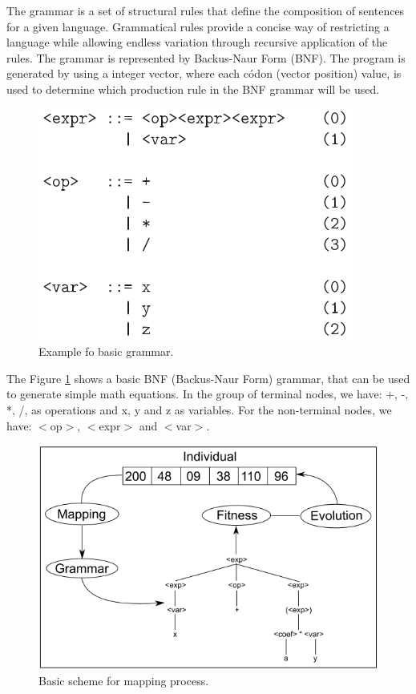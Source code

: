\documentclass[journal]{IEEEtran}
\begin{document}
The grammar is a set of structural rules that define the composition of sentences for a given language. Grammatical rules provide a concise way of restricting a language while allowing endless variation through recursive application of the rules\cite{byrne2015optimising}. The grammar is represented by Backus-Naur Form (BNF). The program is generated by using a integer vector, where each códon (vector position) value, is used to determine which production rule in the BNF grammar will be used.

\begin{figure}[!htb]
	\centering
	\includegraphics[scale=.8]{figures/grammar.png}
	\caption{Example fo basic grammar. \cite{ryan1998grammatical}}
	\label{fig:grammar}
\end{figure}

The Figure \ref{fig:grammar} shows a basic BNF (Backus-Naur Form) grammar, that can be used to generate simple math equations. In the group of terminal nodes, we have: +, -, *, /, as operations and x, y and z as variables. For the non-terminal nodes, we have: $<$op$>$, $<$expr$>$ and $<$var$>$.

\begin{figure}[!htb]
	\centering
	\includegraphics[scale=.6]{figures/ge_algo.png}
	\caption{Basic scheme for mapping process. \cite{cerri2013grammatical}}
	\label{fig:ge_algo}
\end{figure}
\end{document}
